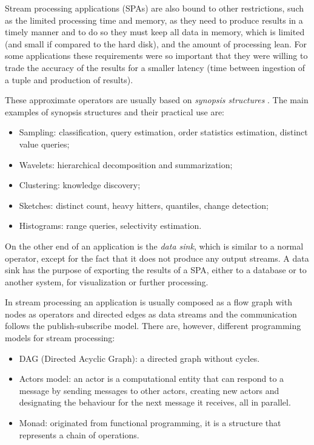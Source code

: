 \documentclass[ppgc,diss,english]{iiufrgs}
\begin{document}
Stream processing applications (SPAs) are also bound to other restrictions, such as the limited processing time and memory, as they need to produce results in a timely manner and to do so they must keep all data in memory, which is limited (and small if compared to the hard disk), and the amount of processing lean. For some applications these requirements were so important that they were willing to trade the accuracy of the results for a smaller latency (time between ingestion of a tuple and production of results).

These approximate operators are usually based on \emph{synopsis structures} \cite{aggarwal2007survey}. The main examples of synopsis structures and their practical use are:

\begin{itemize}
\item Sampling: classification, query estimation, order statistics estimation, distinct value queries;
\item Wavelets: hierarchical decomposition and summarization;
\item Clustering: knowledge discovery;
\item Sketches: distinct count, heavy hitters, quantiles, change detection;
\item Histograms: range queries, selectivity estimation.
\end{itemize}

On the other end of an application is the \emph{data sink}, which is similar to a normal operator, except for the fact that it does not produce any output streams. A data sink has the purpose of exporting the results of a SPA, either to a database or to another system, for visualization or further processing.


In stream processing an application is usually composed as a flow graph with nodes as operators and directed edges as data streams and the communication follows the publish-subscribe model. There are, however, different programming models for stream processing:

\begin{itemize}
\item DAG (Directed Acyclic Graph): a directed graph without cycles.
\item Actors model: an actor is a computational entity that can respond to a message by sending messages to other actors, creating new actors and designating the behaviour for the next message it receives, all in parallel.
\item Monad: originated from functional programming, it is a structure that represents a chain of operations.
\end{itemize}
\end{document}

